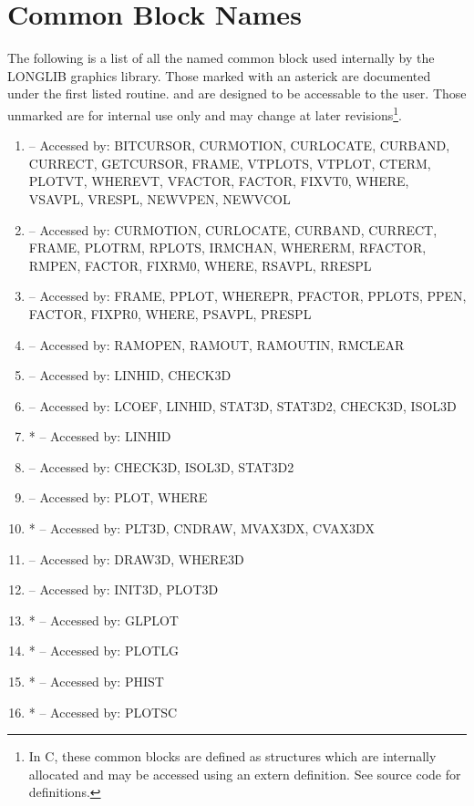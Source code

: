 \documentclass[11pt]{report}
\begin{document}
\normalsize
\newpage
\section{Common Block Names}

The following is a list of all the named common block used internally
by the LONGLIB graphics library.  Those marked with an asterick are documented
under the first listed routine.
and are designed to be accessable to the user.  Those
unmarked are for internal use only and may change at later revisions\footnote{
In C, these common blocks are defined as structures which are internally
allocated and may be accessed using an extern definition.  See source code
for definitions.}.

\begin{enumerate}
\item {} -- Accessed by: BITCURSOR, CURMOTION, CURLOCATE, CURBAND, 
CURRECT,
GETCURSOR, FRAME, VTPLOTS, VTPLOT, CTERM, PLOTVT, WHEREVT,
VFACTOR, FACTOR, FIXVT0, WHERE, VSAVPL, VRESPL, NEWVPEN, NEWVCOL
\item {} -- Accessed by: CURMOTION, CURLOCATE, CURBAND, CURRECT, FRAME, 
PLOTRM, RPLOTS, IRMCHAN, WHERERM, RFACTOR, RMPEN, FACTOR,
FIXRM0, WHERE, RSAVPL, RRESPL
\item {} -- Accessed by: FRAME, PPLOT, WHEREPR, PFACTOR,
PPLOTS, PPEN, FACTOR, FIXPR0, WHERE, PSAVPL, PRESPL
\item {} -- Accessed by: RAMOPEN, RAMOUT, RAMOUTIN, RMCLEAR
\item {} -- Accessed by: LINHID, CHECK3D
\item {} -- Accessed by: LCOEF, LINHID, STAT3D, STAT3D2, CHECK3D, ISOL3D
\item {} * -- Accessed by: LINHID
\item {} -- Accessed by: CHECK3D, ISOL3D, STAT3D2
\item {} -- Accessed by: PLOT, WHERE
\item {} * -- Accessed by: PLT3D, CNDRAW, MVAX3DX, CVAX3DX
\item {} -- Accessed by: DRAW3D, WHERE3D
\item {} -- Accessed by: INIT3D, PLOT3D
\item {} * -- Accessed by: GLPLOT
\item {} * -- Accessed by: PLOTLG
\item {} * -- Accessed by: PHIST
\item {} * -- Accessed by: PLOTSC

\end{enumerate}
\end{document}
